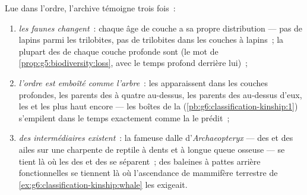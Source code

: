 \begin{proposition}\label{prop:g9:evidence-of-evolution:record}
Lue dans l'ordre, l'archive témoigne trois fois~:
\begin{enumerate}
  \item \emph{les faunes changent}~: chaque âge de couche a
        sa propre distribution --- pas de lapins parmi les
        trilobites, pas de trilobites dans les couches à
        lapins~; la plupart des  de chaque couche
        profonde sont \emph{} (le mot de
        \cref{prop:g5:biodiversity:loss}, avec le temps
        profond derrière lui)~;
  \item \emph{l'ordre est emboîté comme l'arbre}~: les
         apparaissent dans les couches profondes,
        les parents des  à quatre 
        au-dessus, les parents des  au-dessus
        d'eux, les  et les  plus haut
        encore --- les boîtes de la 
        (\cref{pb:g6:classification-kinship:1}) s'empilent
        dans le temps exactement comme la  le
        prédit~;
  \item \emph{des intermédiaires existent}~: la fameuse
        dalle d'\emph{Archaeopteryx} --- des  et des
        ailes sur une charpente de reptile à dents et à
        longue queue osseuse --- se tient là où les
         des  et des  se séparent~;
        des baleines  à pattes arrière
        fonctionnelles se tiennent là où l'ascendance de
        mammifère terrestre de
        \cref{ex:g6:classification-kinship:whale} les
        exigeait.
\end{enumerate}
\end{proposition}
\admitted

